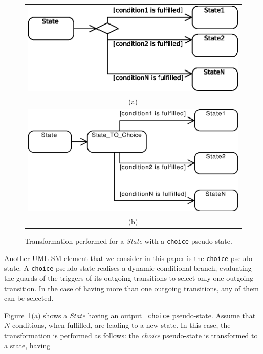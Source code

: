 \begin{figure}
  \centering
  \begin{tabular}{c}
  \includegraphics[width=0.7\columnwidth]{images/choiceBEFORE}\\ 
(a)\\
  \includegraphics[width=0.7\columnwidth]{images/choiceAFTER}\\
(b)
  \end{tabular}
  \caption{Transformation performed for a {\em State} with a {\tt choice} 
pseudo-state.}
  \label{fig:choicePseudostate}
\end{figure}

Another UML-SM element that we consider in this paper is the {\tt choice}
pseudo-state. A {\tt choice} pseudo-state realises a dynamic conditional
branch, evaluating the guards of the triggers of its outgoing transitions to
select only one outgoing transition. In the case of having more than one
outgoing transitions, any of them can be selected.

Figure~\ref{fig:choicePseudostate}(a) shows a {\em State} having an output {\tt
choice} pseudo-state. Assume that $N$ conditions, when fulfilled, are leading to
a new state. In this case, the transformation is
performed as follows: the {\em choice} pseudo-state is transformed to a state,
having \TODO{\ldots}

